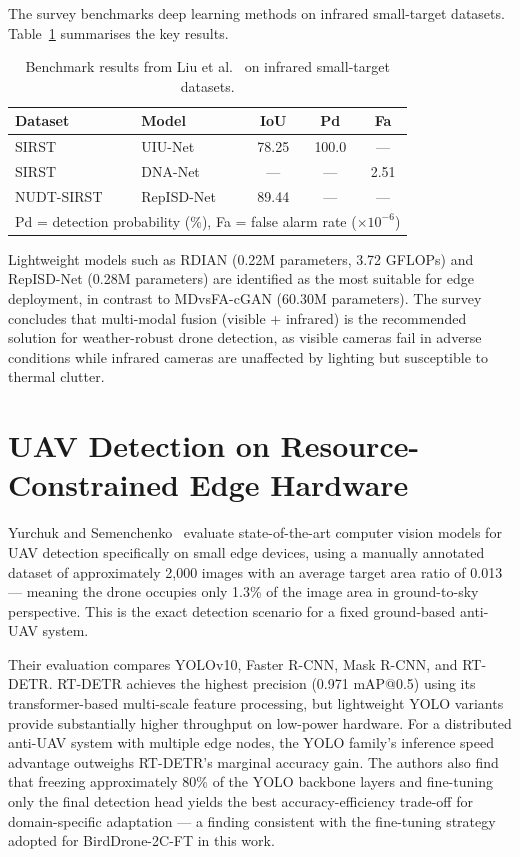 \documentclass[12pt,a4paper]{report}
\begin{document}
The survey benchmarks deep learning methods on infrared small-target datasets.
Table~\ref{tab:survey_benchmarks} summarises the key results.

\begin{table}[H]
\centering
\caption{Benchmark results from Liu et al.~\cite{liu2024survey} on infrared small-target datasets.}
\label{tab:survey_benchmarks}
\small
\begin{tabular}{|l|l|c|c|c|}
\hline
\textbf{Dataset} & \textbf{Model} & \textbf{IoU} & \textbf{Pd} & \textbf{Fa} \\
\hline
SIRST  & UIU-Net      & 78.25 & 100.0 & ---  \\
SIRST  & DNA-Net      & ---   & ---   & 2.51 \\
NUDT-SIRST & RepISD-Net & 89.44 & ---  & ---  \\
\hline
\multicolumn{5}{l}{\small Pd = detection probability (\%), Fa = false alarm rate ($\times 10^{-6}$)} \\
\end{tabular}
\end{table}

Lightweight models such as RDIAN (0.22M parameters, 3.72 GFLOPs) and
RepISD-Net (0.28M parameters) are identified as the most suitable for edge
deployment, in contrast to MDvsFA-cGAN (60.30M parameters). The survey
concludes that multi-modal fusion (visible + infrared) is the recommended
solution for weather-robust drone detection, as visible cameras fail in
adverse conditions while infrared cameras are unaffected by lighting
but susceptible to thermal clutter.

\section{UAV Detection on Resource-Constrained Edge Hardware}

Yurchuk and Semenchenko~\cite{yurchuk2024edge} evaluate state-of-the-art
computer vision models for UAV detection specifically on small edge devices,
using a manually annotated dataset of approximately 2,000 images with an
average target area ratio of 0.013 --- meaning the drone occupies only
1.3\% of the image area in ground-to-sky perspective. This is the exact
detection scenario for a fixed ground-based anti-UAV system.

Their evaluation compares YOLOv10, Faster R-CNN, Mask R-CNN, and RT-DETR.
RT-DETR achieves the highest precision (0.971 mAP@0.5) using its
transformer-based multi-scale feature processing, but lightweight YOLO
variants provide substantially higher throughput on low-power hardware.
For a distributed anti-UAV system with multiple edge nodes, the YOLO
family's inference speed advantage outweighs RT-DETR's marginal accuracy
gain. The authors also find that freezing approximately 80\% of the YOLO
backbone layers and fine-tuning only the final detection head yields the
best accuracy-efficiency trade-off for domain-specific adaptation ---
a finding consistent with the fine-tuning strategy adopted for
BirdDrone-2C-FT in this work.
\end{document}
